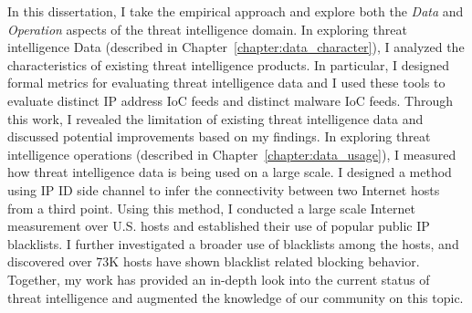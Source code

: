 In this dissertation, I take the empirical approach and explore both the 
\textit{Data} and \textit{Operation} aspects of the threat intelligence
domain. In exploring threat intelligence Data (described in
Chapter~\ref{chapter:data_character}), I analyzed the characteristics of
existing threat intelligence products. In particular, I designed formal 
metrics for evaluating threat intelligence data and I used these tools to 
evaluate {\numipfeeds} distinct IP address IoC feeds and {\numhashfeeds}
distinct malware IoC feeds. Through this work, I revealed the limitation of
existing threat intelligence data and discussed potential improvements 
based on my findings. In exploring threat intelligence operations 
(described in Chapter~\ref{chapter:data_usage}),
I measured how threat intelligence data is being used on a large scale. 
I designed a method using IP ID side channel to infer the connectivity 
between two Internet hosts from a third point. Using this 
method, I conducted a large scale Internet measurement over {} 
U.S. hosts and established their use of {\blacklistnum} popular public IP
blacklists. I further investigated a broader use of blacklists among the 
hosts, and discovered over 73K hosts have shown blacklist related blocking 
behavior. Together, my work has provided an in-depth look into the current
status of threat intelligence and augmented the knowledge of our community
on this topic.

